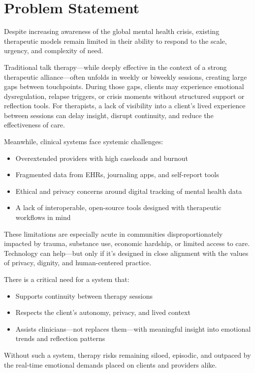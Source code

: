 \section*{Problem Statement}

Despite increasing awareness of the global mental health crisis, existing therapeutic models remain limited in their ability to respond to the scale, urgency, and complexity of need. 

Traditional talk therapy—while deeply effective in the context of a strong therapeutic alliance—often unfolds in weekly or biweekly sessions, creating large gaps between touchpoints. During those gaps, clients may experience emotional dysregulation, relapse triggers, or crisis moments without structured support or reflection tools. For therapists, a lack of visibility into a client’s lived experience between sessions can delay insight, disrupt continuity, and reduce the effectiveness of care.

Meanwhile, clinical systems face systemic challenges:

\begin{itemize}
  \item Overextended providers with high caseloads and burnout
  \item Fragmented data from EHRs, journaling apps, and self-report tools
  \item Ethical and privacy concerns around digital tracking of mental health data
  \item A lack of interoperable, open-source tools designed with therapeutic workflows in mind
\end{itemize}

These limitations are especially acute in communities disproportionately impacted by trauma, substance use, economic hardship, or limited access to care. Technology can help—but only if it's designed in close alignment with the values of privacy, dignity, and human-centered practice.

There is a critical need for a system that:
\begin{itemize}
  \item Supports continuity between therapy sessions
  \item Respects the client’s autonomy, privacy, and lived context
  \item Assists clinicians—not replaces them—with meaningful insight into emotional trends and reflection patterns
\end{itemize}

Without such a system, therapy risks remaining siloed, episodic, and outpaced by the real-time emotional demands placed on clients and providers alike.
